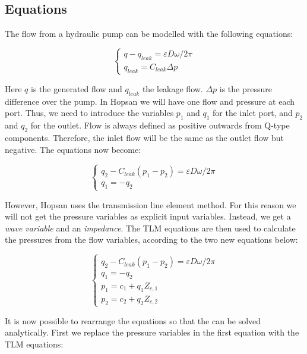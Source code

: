\documentclass[a4paper,pdftex]{article}
\begin{document}
\subsection*{Equations}
The flow from a hydraulic pump can be modelled with the following equations:

\begin{equation*}
\begin{cases}
q - q_{leak} = \varepsilon D \omega/2\pi \\
q_{leak} = C_{leak}\Delta p
\end{cases}
\end{equation*}

\noindent Here $q$ is the generated flow and $q_{leak}$ the leakage flow. $\Delta p$ is the pressure difference over the pump. In Hopsan we will have one flow and pressure at each port. Thus, we need to introduce the variables $p_{1}$ and $q_{1}$ for the inlet port, and $p_{2}$ and $q_{2}$ for the outlet. Flow is always defined as positive outwards from Q-type components. Therefore, the inlet flow will be the same as the outlet flow but negative. The equations now become:

\begin{equation*}
\begin{cases}
q_{2} - C_{leak}(p_{1}-p_{2}) = \varepsilon D \omega/2\pi \\
q_{1} = -q_{2}
\end{cases}
\end{equation*}

\noindent However, Hopsan uses the transmission line element method. For this reason we will not get the pressure variables as explicit input variables. Instead, we get a \textit{wave variable} and an \textit{impedance}. The TLM equations are then used to calculate the pressures from the flow variables, according to the two new equations below:

\begin{equation*}
\begin{cases}
q_{2} - C_{leak}(p_{1}-p_{2}) = \varepsilon D \omega/2\pi \\
q_{1} = -q_{2}\\
p_{1} = c_{1} + q_{1}Z_{c,1}\\
p_{2} = c_{2} + q_{2}Z_{c,2}
\end{cases}
\end{equation*}

\noindent It is now possible to rearrange the equations so that the can be solved analytically. First we replace the pressure variables in the first equation with the TLM equations:
\end{document}
